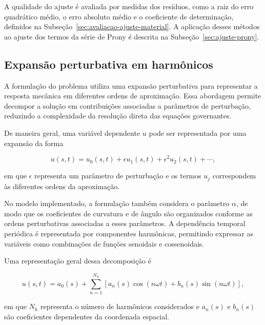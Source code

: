 \documentclass[arial,centeredequations,english,brazilian,oneside,section=TITLE]{ifes8}
\begin{document}
A qualidade do ajuste é avaliada por medidas dos resíduos, como a raiz do erro quadrático médio, o erro
absoluto médio e o coeficiente de determinação, definidos na
Subseção~\ref{sec:avaliacao-ajuste-material}. A aplicação desses métodos ao ajuste dos
termos da série de Prony é descrita na Subseção~\ref{sec:ajuste-prony}.

\subsection{Expansão perturbativa em harmônicos}
\label{subsec:expansao-perturbativa}

A formulação do problema utiliza uma expansão perturbativa para
representar a resposta mecânica em diferentes ordens de aproximação.
Essa abordagem permite decompor a solução em contribuições associadas
a parâmetros de perturbação, reduzindo a complexidade da resolução
direta das equações governantes.

De maneira geral, uma variável dependente $u$ pode ser representada
por uma expansão da forma

\begin{equation}
  u(s,t) =
  u_0(s,t) +
  \epsilon u_1(s,t) +
  \epsilon^2 u_2(s,t) + \cdots,
  \label{eq:expansao-perturbativa}
\end{equation}

em que $\epsilon$ representa um parâmetro de perturbação e os
termos $u_j$ correspondem às diferentes ordens da aproximação.

No modelo implementado, a formulação também considera o parâmetro
$\alpha$, de modo que os coeficientes de curvatura e de ângulo são
organizados conforme as ordens perturbativas associadas a esses
parâmetros. A dependência temporal periódica é representada por
componentes harmônicas, permitindo expressar as variáveis como
combinações de funções senoidais e cossenoidais.

Uma representação geral dessa decomposição é

\begin{equation}
  u(s,t) =
  a_0(s) +
  \sum_{n=1}^{N_h}
  \left[
    a_n(s)\cos(n\omega t) +
    b_n(s)\sin(n\omega t)
  \right],
  \label{eq:expansao-harmonica}
\end{equation}

em que $N_h$ representa o número de harmônicos considerados e
$a_n(s)$ e $b_n(s)$ são coeficientes dependentes da coordenada
espacial.
\end{document}

